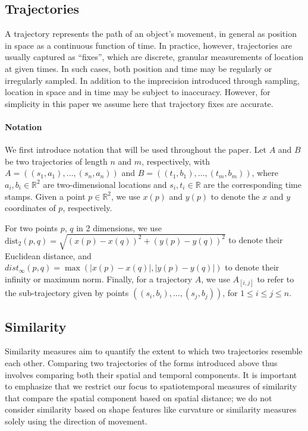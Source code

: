 \documentclass[10pt,letterpaper]{article}
\newcommand{\R}{\ensuremath{\mathbb{R}}}
\newcommand{\dist}{\ensuremath{\text{dist}}}
\begin{document}
\subsection{Trajectories}
A trajectory represents the path of an object's movement, in general as position in space as a continuous function of time. In practice, however, trajectories are usually captured as ``fixes'', which are discrete, granular measurements of location at given times. In such cases, both position and time may be regularly or irregularly sampled. In addition to the imprecision introduced through sampling, location in space and in time may be subject to inaccuracy. However, for simplicity in this paper we assume here that trajectory fixes are accurate.


\paragraph{Notation} We first introduce notation that will be used throughout the paper.
Let $A$ and $B$ be two trajectories of length $n$ and $m$, respectively, with $A=((s_1,a_1),\dots, (s_n,a_n))$ and $B=((t_1,b_1),\dots, (t_m,b_m))$, where $a_i,b_i \in \R^2$ are two-dimensional locations and $s_i, t_i \in \R$ are the corresponding time stamps.
Given a point $p \in \R^2$, we use $x(p)$ and $y(p)$ to denote the $x$ and $y$ coordinates of $p$, respectively.

For two points $p$, $q$ in 2 dimensions, we use $\dist_2(p,q)=\sqrt {(x(p)-x(q))^2+(y(p)-y(q))^2}$ to denote their Euclidean distance, and $dist_\infty(p,q)=\max(|x(p)-x(q)|,|y(p)-y(q)|)$  to denote their infinity or maximum norm. Finally, for a trajectory $A$, we use $A_{[i,j]}$ to refer to the sub-trajectory given by points $((s_i,b_i),\dots, (s_j,b_j))$, for $1 \leq i \leq j \leq n$.


\subsection{Similarity}
Similarity measures aim to quantify the extent to which two trajectories resemble each other. Comparing two trajectories of the forms introduced above thus involves comparing both their spatial and temporal components. It is important to emphasize that we restrict our focus to spatiotemporal measures of similarity that compare the spatial component based on spatial distance; we do not consider similarity based on shape features like curvature or similarity measures solely using the direction of movement. 
\end{document}
